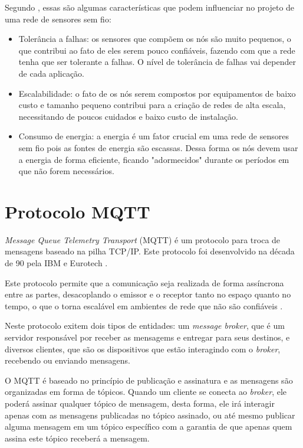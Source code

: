 Segundo , essas são algumas características que podem influenciar no projeto de uma rede de sensores sem fio:

\begin{itemize}
    \item Tolerância a falhas: os sensores que compõem os nós são muito pequenos, o que contribui ao fato de eles serem pouco confiáveis, fazendo com que a rede tenha que ser tolerante a falhas. O nível de tolerância de falhas vai depender de cada aplicação. 
    \item Escalabilidade: o fato de os nós serem compostos por equipamentos de baixo custo e tamanho pequeno contribui para a criação de redes de alta escala, necessitando de poucos cuidados e baixo custo de instalação.
    \item Consumo de energia: a energia é um fator crucial em uma rede de sensores sem fio pois as fontes de energia são escassas. Dessa forma os nós devem usar a energia de forma eficiente, ficando "adormecidos" durante os períodos em que não forem necessários.
\end{itemize}

\section{Protocolo MQTT} \label{sec:mqtt}
\textit{Message Queue Telemetry Transport} (MQTT) é um protocolo para troca de mensagens baseado na pilha TCP/IP. Este protocolo foi desenvolvido na década de 90 pela IBM e Eurotech \cite{basilio2018mqtt}.

Este protocolo permite que a comunicação seja realizada de forma assíncrona entre as partes, desacoplando o emissor e o receptor tanto no espaço quanto no tempo, o que o torna escalável em ambientes de rede que não são confiáveis \cite{yuan2017mqtt}.

Neste protocolo exitem dois tipos de entidades: um \textit{message broker}, que é um servidor responsável por receber as mensagems e entregar para seus destinos, e diversos clientes, que são os dispositivos que estão interagindo com o \textit{broker}, recebendo ou enviando mensagens. 

O MQTT é baseado no princípio de publicação e assinatura e as mensagens são organizadas em forma de tópicos. Quando um cliente se conecta ao \textit{broker}, ele poderá assinar qualquer tópico de mensagem, desta forma, ele irá interagir apenas com as mensagens publicadas no tópico assinado, ou até mesmo publicar alguma mensagem em um tópico específico com a garantia de que apenas quem assina este tópico receberá a mensagem.

